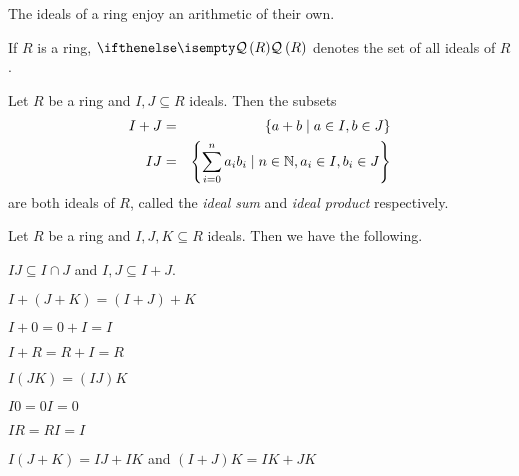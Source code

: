 The ideals of a ring enjoy an arithmetic of their own.

\begin{dfn}
If \(R\) is a ring, \(\IDEALS{R}\) denotes the set of all ideals of \(R\).
\end{dfn}

\begin{prop}
Let \(R\) be a ring and \(I, J \subseteq R\) ideals. Then the subsets
\begin{eqnarray*}
I + J & = & \{ a+b \mid a \in I, b \in J \} \\
I   J & = & \left\{ \sum_{i=0}^n a_i b_i \mid n \in \mathbb{N}, a_i \in I, b_i \in J \right\}
\end{eqnarray*}
are both ideals of \(R\), called the \emph{ideal sum} and \emph{ideal product} respectively.
\end{prop}

\begin{prop}
Let \(R\) be a ring and \(I,J,K \subseteq R\) ideals. Then we have the following.
\begin{proplist}
\item \(IJ \subseteq I \cap J\) and \(I,J \subseteq I+J\).
\item \(I+(J+K) = (I+J)+K\)
\item \(I+0 = 0+I = I\)
\item \(I+R = R+I = R\)
\item \(I(JK) = (IJ)K\)
\item \(I0 = 0I = 0\)
\item \(IR = RI = I\)
\item \(I(J+K) = IJ+IK\) and \((I+J)K = IK+JK\)
\end{proplist}
\end{prop}



\Exercises%

